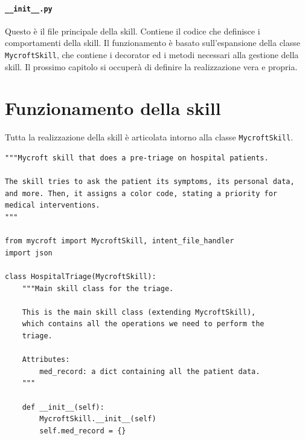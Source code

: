 \paragraph{\texttt{\_\_init\_\_.py}}
Questo è il file principale della skill. Contiene il codice che definisce i comportamenti della skill. Il funzionamento è basato sull'espansione della classe \texttt{MycroftSkill}, che contiene i decorator ed i metodi necessari alla gestione della skill. Il prossimo capitolo si occuperà di definire la realizzazione vera e propria.
\section{Funzionamento della skill}
Tutta la realizzazione della skill è articolata intorno alla classe \texttt{MycroftSkill}.
\begin{verbatim}
"""Mycroft skill that does a pre-triage on hospital patients.

The skill tries to ask the patient its symptoms, its personal data, 
and more. Then, it assigns a color code, stating a priority for
medical interventions.
"""

from mycroft import MycroftSkill, intent_file_handler
import json

class HospitalTriage(MycroftSkill):
    """Main skill class for the triage.

    This is the main skill class (extending MycroftSkill),
    which contains all the operations we need to perform the
    triage.

    Attributes:
        med_record: a dict containing all the patient data.
    """

    def __init__(self):
        MycroftSkill.__init__(self)
        self.med_record = {}
\end{verbatim}
